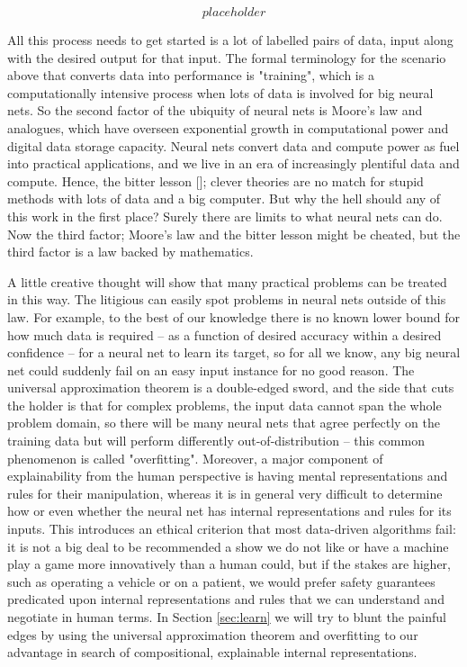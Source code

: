 \[placeholder\]

All this process needs to get started is a lot of labelled pairs of data, input along with the desired output for that input. The formal terminology for the scenario above that converts data into performance is "training", which is a computationally intensive process when lots of data is involved for big neural nets. So the second factor of the ubiquity of neural nets is Moore's law and analogues, which have overseen exponential growth in computational power and digital data storage capacity. Neural nets convert data and compute power as fuel into practical applications, and we live in an era of increasingly plentiful data and compute. Hence, the bitter lesson []; clever theories are no match for stupid methods with lots of data and a big computer. But why the hell should any of this work in the first place? Surely there are limits to what neural nets can do. Now the third factor; Moore's law and the bitter lesson might be cheated, but the third factor is a law backed by mathematics.

\begin{theorem}

\end{theorem}

 A little creative thought will show that many practical problems can be treated in this way. The litigious can easily spot problems in neural nets outside of this law. For example, to the best of our knowledge there is no known lower bound for how much data is required -- as a function of desired accuracy within a desired confidence -- for a neural net to learn its target, so for all we know, any big neural net could suddenly fail on an easy input instance for no good reason. The universal approximation theorem is a double-edged sword, and the side that cuts the holder is that for complex problems, the input data cannot span the whole problem domain, so there will be many neural nets that agree perfectly on the training data but will perform differently out-of-distribution -- this common phenomenon is called "overfitting". Moreover, a major component of explainability from the human perspective is having mental representations and rules for their manipulation, whereas it is in general very difficult to determine how or even whether the neural net has internal representations and rules for its inputs. This introduces an ethical criterion that most data-driven algorithms fail: it is not a big deal to be recommended a show we do not like or have a machine play a game more innovatively than a human could, but if the stakes are higher, such as operating a vehicle or on a patient, we would prefer safety guarantees predicated upon internal representations and rules that we can understand and negotiate in human terms. In Section \ref{sec:learn} we will try to blunt the painful edges by using the universal approximation theorem and overfitting to our advantage in search of compositional, explainable internal representations.

